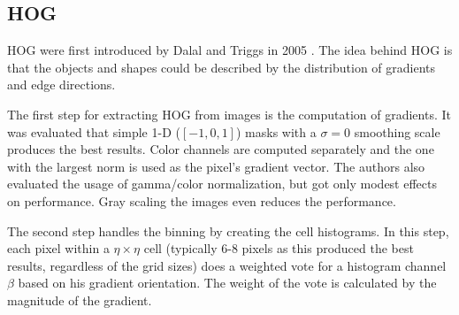 \subsection{\acf{HOG}}
\label{sec:hog}

\ac{HOG} were first introduced by Dalal and Triggs in 2005 \cite{Dalal2005}. The idea behind \ac{HOG} is that the objects and shapes could be described by the distribution of gradients and edge directions.

The first step for extracting \ac{HOG} from images is the computation of gradients. It was evaluated that simple 1-D ($[-1, 0, 1]$) masks with a $\sigma = 0$ smoothing scale produces the best results. Color channels are computed separately and the one with the largest norm is used as the pixel's gradient vector. The authors also evaluated the usage of gamma/color normalization, but got only modest effects on performance. Gray scaling the images even reduces the performance.

The second step handles the binning by creating the cell histograms. In this step, each pixel within a $\eta \times \eta$ cell (typically 6-8 pixels as this produced the best results, regardless of the grid sizes) does a weighted vote for a histogram channel $\beta$ based on his gradient orientation. The weight of the vote is calculated by the magnitude of the gradient.

